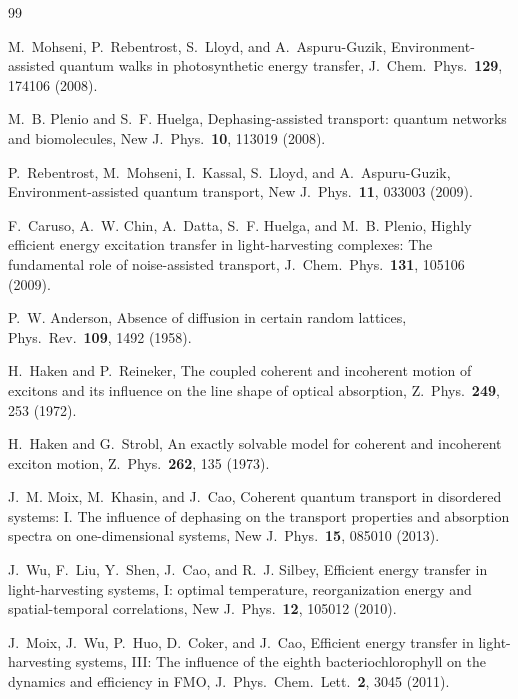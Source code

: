 \documentclass[aps,pre,preprint,floatfix]{revtex4-2}
\begin{document}
\begin{thebibliography}{99}

M.~Mohseni, P.~Rebentrost, S.~Lloyd, and A.~Aspuru-Guzik,
Environment-assisted quantum walks in photosynthetic energy transfer,
J.~Chem.\ Phys.\ \textbf{129}, 174106 (2008).

M.~B. Plenio and S.~F. Huelga,
Dephasing-assisted transport: quantum networks and biomolecules,
New J.\ Phys.\ \textbf{10}, 113019 (2008).

P.~Rebentrost, M.~Mohseni, I.~Kassal, S.~Lloyd, and A.~Aspuru-Guzik,
Environment-assisted quantum transport,
New J.\ Phys.\ \textbf{11}, 033003 (2009).

F.~Caruso, A.~W. Chin, A.~Datta, S.~F. Huelga, and M.~B. Plenio,
Highly efficient energy excitation transfer in light-harvesting complexes:
The fundamental role of noise-assisted transport,
J.~Chem.\ Phys.\ \textbf{131}, 105106 (2009).

P.~W. Anderson,
Absence of diffusion in certain random lattices,
Phys.\ Rev.\ \textbf{109}, 1492 (1958).

H.~Haken and P.~Reineker,
The coupled coherent and incoherent motion of excitons and its influence on
the line shape of optical absorption,
Z.~Phys.\ \textbf{249}, 253 (1972).

H.~Haken and G.~Strobl,
An exactly solvable model for coherent and incoherent exciton motion,
Z.~Phys.\ \textbf{262}, 135 (1973).

J.~M. Moix, M.~Khasin, and J.~Cao,
Coherent quantum transport in disordered systems: I. The influence of
dephasing on the transport properties and absorption spectra on
one-dimensional systems,
New J.\ Phys.\ \textbf{15}, 085010 (2013).

J.~Wu, F.~Liu, Y.~Shen, J.~Cao, and R.~J. Silbey,
Efficient energy transfer in light-harvesting systems, I: optimal temperature,
reorganization energy and spatial-temporal correlations,
New J.\ Phys.\ \textbf{12}, 105012 (2010).

J.~Moix, J.~Wu, P.~Huo, D.~Coker, and J.~Cao,
Efficient energy transfer in light-harvesting systems, III: The influence of
the eighth bacteriochlorophyll on the dynamics and efficiency in FMO,
J.~Phys.\ Chem.\ Lett.\ \textbf{2}, 3045 (2011).


\end{thebibliography}
\end{document}
